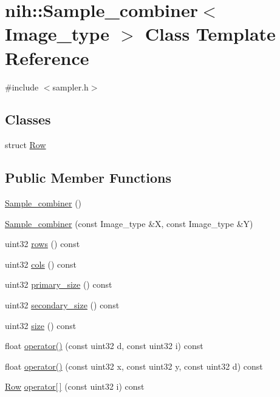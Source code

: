\hypertarget{classnih_1_1_sample__combiner}{
\section{nih\-:\-:\-Sample\-\_\-combiner$<$ \-Image\-\_\-type $>$ \-Class \-Template \-Reference}
\label{classnih_1_1_sample__combiner}
}


{\ttfamily \#include $<$sampler.\-h$>$}

\subsection*{\-Classes}
\begin{DoxyCompactItemize}
\item 
struct \hyperlink{structnih_1_1_sample__combiner_1_1_row}{\-Row}
\end{DoxyCompactItemize}
\subsection*{\-Public \-Member \-Functions}
\begin{DoxyCompactItemize}
\item 
\hyperlink{classnih_1_1_sample__combiner_a22367618b733b1f0479cdd9cb8aa2ece}{\-Sample\-\_\-combiner} ()
\item 
\hyperlink{classnih_1_1_sample__combiner_a4219ba03678b5284ef80f469b805bdda}{\-Sample\-\_\-combiner} (const \-Image\-\_\-type \&\-X, const \-Image\-\_\-type \&\-Y)
\item 
uint32 \hyperlink{classnih_1_1_sample__combiner_a874efd345d08e22acb0fb1dc5c0f1b99}{rows} () const 
\item 
uint32 \hyperlink{classnih_1_1_sample__combiner_aecae5146a02af2bbac2884de97e18d33}{cols} () const 
\item 
uint32 \hyperlink{classnih_1_1_sample__combiner_a75099a4a1489baba07431d31b92d543b}{primary\-\_\-size} () const 
\item 
uint32 \hyperlink{classnih_1_1_sample__combiner_aad15a68a7b87de7414f221b02848596d}{secondary\-\_\-size} () const 
\item 
uint32 \hyperlink{classnih_1_1_sample__combiner_a880fb4d91c5a00af955d920c4dd196e7}{size} () const 
\item 
float \hyperlink{classnih_1_1_sample__combiner_ac3e27a1dd31287bc8d499e4a41caaf45}{operator()} (const uint32 d, const uint32 i) const 
\item 
float \hyperlink{classnih_1_1_sample__combiner_a9c937c9bdd0bd33d3957e4811fd01cca}{operator()} (const uint32 x, const uint32 y, const uint32 d) const 
\item 
\hyperlink{structnih_1_1_sample__combiner_1_1_row}{\-Row} \hyperlink{classnih_1_1_sample__combiner_a2a4ab922122f90d3f9f0264aaf09bcfc}{operator\mbox{[}$\,$\mbox{]}} (const uint32 i) const 
\end{DoxyCompactItemize}


